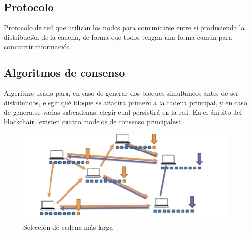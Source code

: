 \documentclass[12pt]{report}
\begin{document}
\subsection{Protocolo}

	Protocolo de red que utilizan los nodos para comunicarse entre sí produciendo la distribución de la cadena, de forma que todos tengan una forma común para compartir información.
	

	
	
\subsection{Algoritmos de consenso}

	Algoritmo usado para, en caso de generar dos bloques simultaneos antes de ser distribuidos, elegir qué bloque se añadirá primero a la cadena principal, y en caso de generarse varias subcadenas, elegir cual persistirá en la red.
	En el ámbito del blockchain, existen cuatro modelos de consenso principales:
\begin{figure}[h]
\includegraphics[scale=0.5]{consenso}
\caption{Selección de cadena más larga}
\end{figure}
	
\end{document}
